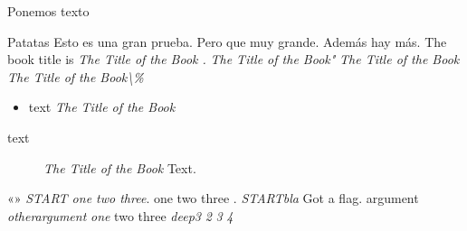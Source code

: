 Ponemos texto

\salto



\lulu

Patatas
Esto es una gran prueba. Pero que muy grande. Además
hay más.
The book title is
\emph{The Title of the Book .}
\emph{The Title of the Book"}
\emph{The Title of the Book}
\emph{The Title of the Book\textbackslash{}\%}
\begin{itemize}
\item text
\emph{The Title of the Book}
\end{itemize}
\begin{description}
\item[text] \emph{The Title of the Book}
Text.
\end{description}
«»
\emph{START one two three}.
one two three .
\emph{START}\emph{bla}
Got a flag.
argument
\emph{otherargument}
\emph{one}
two three
\emph{deep3}
\emph{2}
\emph{3}
\emph{4}

